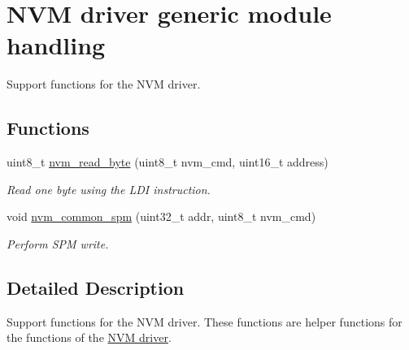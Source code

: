 \hypertarget{group__nvm__generic__group}{\section{N\-V\-M driver generic module handling}
\label{group__nvm__generic__group}
}


Support functions for the N\-V\-M driver.  


\subsection*{Functions}
\begin{DoxyCompactItemize}
\item 
\hypertarget{group__nvm__generic__group_gae7f70077c338416047bdd15bb867d620}{uint8\-\_\-t \hyperlink{group__nvm__generic__group_gae7f70077c338416047bdd15bb867d620}{nvm\-\_\-read\-\_\-byte} (uint8\-\_\-t nvm\-\_\-cmd, uint16\-\_\-t address)}\label{group__nvm__generic__group_gae7f70077c338416047bdd15bb867d620}

\begin{DoxyCompactList}\small\item\em Read one byte using the L\-D\-I instruction. \end{DoxyCompactList}\item 
\hypertarget{group__nvm__generic__group_ga71673dc8a752dc1455213bbceac8058a}{void \hyperlink{group__nvm__generic__group_ga71673dc8a752dc1455213bbceac8058a}{nvm\-\_\-common\-\_\-spm} (uint32\-\_\-t addr, uint8\-\_\-t nvm\-\_\-cmd)}\label{group__nvm__generic__group_ga71673dc8a752dc1455213bbceac8058a}

\begin{DoxyCompactList}\small\item\em Perform S\-P\-M write. \end{DoxyCompactList}\end{DoxyCompactItemize}


\subsection{Detailed Description}
Support functions for the N\-V\-M driver. These functions are helper functions for the functions of the \hyperlink{group__nvm__group}{N\-V\-M driver}. 